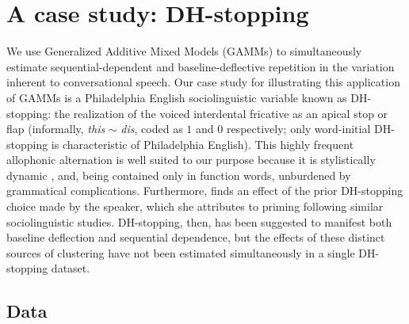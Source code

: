 \documentclass[12pt]{article}
\begin{document}
\section{A case study: DH-stopping}

We use Generalized Additive Mixed Models (GAMMs) to simultaneously estimate sequential-dependent and baseline-deflective repetition in the variation inherent to conversational speech. Our case study for illustrating this application of GAMMs is a Philadelphia English sociolinguistic variable known as DH-stopping: the realization of the voiced interdental fricative as an apical stop or flap (informally, \emph{this} $\sim$ \emph{dis}, coded as $1$ and $0$ respectively; only word-initial DH-stopping is characteristic of Philadelphia English).  This highly frequent allophonic alternation is well suited to our purpose because it is stylistically dynamic \citep{Labov:2001}, and, being contained only in function words, unburdened by grammatical complications. Furthermore, \citet{Tamminga:2014b} finds an effect of the prior DH-stopping choice made by the speaker, which she attributes to priming following similar sociolinguistic studies. DH-stopping, then, has been suggested to manifest both baseline deflection and sequential dependence, but the effects of these distinct sources of clustering have not been estimated simultaneously in a single DH-stopping dataset.

\subsection{Data}
\end{document}
